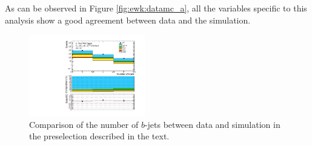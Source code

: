 As can be observed in Figure \ref{fig:ewk:datamc_a}, all the variables specific to this analysis show a good 
agreement between data and the simulation. 

\begin{figure}[htbp]
\centering 
\includegraphics[width=0.45\textwidth]{figures/ewk_prod/data_mc/0L_3bin/data_mc_bjets_n.pdf}
\caption{Comparison of the number of $b$-jets between data and simulation in the preselection described in the text.
}
\label{fig:ewk:datamc_bjets}
\end{figure}

